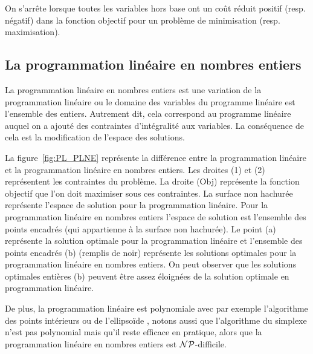On s'arrête lorsque toutes les variables hors base ont un coût réduit positif (resp. négatif) dans la fonction objectif pour un problème de minimisation (resp. maximisation).

\subsection{La programmation linéaire en nombres entiers \label{subsec:PLNE}}

La programmation linéaire en nombres entiers est une variation de la programmation linéaire ou le domaine des variables du programme linéaire est l'ensemble des entiers.
Autrement dit, cela correspond au programme linéaire auquel on a ajouté des contraintes d'intégralité aux variables.
La conséquence de cela est la modification de l'espace des solutions.

La figure~\ref{fig:PL_PLNE} représente la différence entre la programmation linéaire et la programmation linéaire en nombres entiers.
Les droites (1) et (2) représentent les contraintes du problème.
La droite (Obj) représente la fonction objectif que l'on doit maximiser sous ces contraintes.
La surface non hachurée représente l'espace de solution pour la programmation linéaire.
Pour la programmation linéaire en nombres entiers l'espace de solution est l'ensemble des points encadrés (qui appartienne à la surface non hachurée).
Le point (a) représente la solution optimale pour la programmation linéaire et l'ensemble des points encadrés (b) (remplis de noir) représente les solutions optimales pour la programmation linéaire en nombres entiers.
On peut observer que les solutions optimales entières (b) peuvent être assez éloignées de la solution optimale en programmation linéaire.


De plus, la programmation linéaire est polynomiale avec par exemple l'algorithme des points intérieurs \cite{karmarkar1984new} ou de l'ellipsoïde \cite{khachiyan1980polynomial}, notons aussi que l'algorithme du simplexe n'est pas polynomial \cite{klee1970good} mais qu'il reste efficace en pratique, alors que la programmation linéaire en nombres entiers est $\mathcal{NP}$-difficile.

